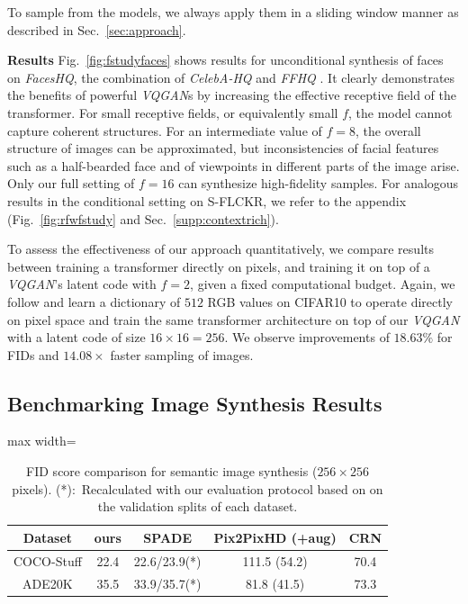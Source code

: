 To sample from the models, we always apply them in a sliding window manner as described in
Sec.~\ref{sec:approach}.

 \textbf{Results} Fig.~\ref{fig:fstudyfaces} shows results for unconditional synthesis of faces on \emph{FacesHQ}, the combination of \emph{CelebA-HQ}
\cite{karras2018progressive} and \emph{FFHQ} \cite{karras2019stylebased}. It clearly demonstrates the benefits of powerful \emph{VQGAN}s by increasing the effective receptive field of the transformer. For small receptive fields, or equivalently small $f$, the model cannot capture coherent structures. For an intermediate value of $f=8$, the overall structure of images can be approximated, but inconsistencies of facial features such as a half-bearded face and of viewpoints in different parts of the image arise. Only our full setting of $f=16$ can synthesize high-fidelity samples. For analogous results in the conditional setting on S-FLCKR, we refer to the appendix (Fig.~\ref{fig:rfwfstudy} and Sec.~\ref{supp:contextrich}).

To assess the effectiveness of our approach quantitatively, we compare results between training a transformer directly on pixels, and training it on top of a
\emph{VQGAN}'s
latent code with $f=2$, given a fixed computational budget. Again, we follow \cite{chen2020generative} and learn a dictionary of $512$ RGB values on CIFAR10 to operate directly on pixel space and train the same transformer architecture on top of our
\emph{VQGAN} with a latent code of size $16\times16=256$. We observe improvements of $18.63\%$ for FIDs and $14.08\times$ faster sampling of images.

\subsection{Benchmarking Image Synthesis Results}
\label{subsec:quantitative}

\begin{table}[t]
\begin{footnotesize}
  \begin{adjustbox}{max width=\linewidth}
\begin{tabular}{ccccc}
  Dataset & \textbf{ours} & SPADE \cite{park2019semantic} & Pix2PixHD (+aug) \cite{wang2018pix2pixHD} & CRN \cite{ChenK17} \\
\toprule
  COCO-Stuff & 22.4 & 22.6/23.9(*) & 111.5 (54.2) & 70.4 \\
  ADE20K & 35.5 & 33.9/35.7(*) & 81.8 (41.5) & 73.3 \\
\bottomrule
\end{tabular}
  \end{adjustbox}
\end{footnotesize}
\caption{\label{tab:semanticsynth}FID score comparison for semantic image
  synthesis ($256 \times 256$ pixels). (*):~Recalculated with our evaluation protocol based on \cite{obukhov2020torchfidelity} on the validation splits of each dataset.
    }

\end{table}

